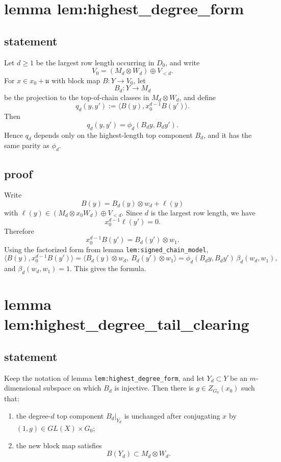 \documentclass[
]{article}
\providecommand{\tightlist}{%
  \setlength{\itemsep}{0pt}\setlength{\parskip}{0pt}}
\begin{document}
\section{lemma
lem:highest\_degree\_form}\label{lemma-lemhighest_degree_form}

\subsection{statement}\label{statement-11}

Let \(d\ge 1\) be the largest row length occurring in \(D_0\), and write
\[
V_0=(M_d\otimes W_d)\oplus V_{<d}.
\] For \(x\in x_0+\mathfrak u\) with block map \(B:Y\to V_0\), let \[
B_d:Y\to M_d
\] be the projection to the top-of-chain classes in \(M_d\otimes W_d\),
and define \[
q_d(y,y'):=\langle B(y),x_0^{d-1}B(y')\rangle.
\] Then \[
q_d(y,y')=\phi_d(B_dy,B_dy').
\] Hence \(q_d\) depends only on the highest-length top component
\(B_d\), and it has the same parity as \(\phi_d\).

\subsection{proof}\label{proof-11}

Write \[
B(y)=B_d(y)\otimes w_d+\ell(y)
\] with \(\ell(y)\in (M_d\otimes x_0W_d)\oplus V_{<d}\). Since \(d\) is
the largest row length, we have \[
x_0^{d-1}\ell(y')=0.
\] Therefore \[
x_0^{d-1}B(y')=B_d(y')\otimes w_1.
\] Using the factorized form from lemma
\texttt{lem:signed\_chain\_model}, \[
\langle B(y),x_0^{d-1}B(y')\rangle
=
\langle B_d(y)\otimes w_d,\ B_d(y')\otimes w_1\rangle
=
\phi_d(B_dy,B_dy')\,\beta_d(w_d,w_1),
\] and \(\beta_d(w_d,w_1)=1\). This gives the formula.

\section{lemma
lem:highest\_degree\_tail\_clearing}\label{lemma-lemhighest_degree_tail_clearing}

\subsection{statement}\label{statement-12}

Keep the notation of lemma \texttt{lem:highest\_degree\_form}, and let
\(Y_d\subset Y\) be an \(m\)-dimensional subspace on which \(B_d\) is
injective. Then there is \(g\in Z_{G_0}(x_0)\) such that:

\begin{enumerate}
\def\labelenumi{\arabic{enumi}.}
\tightlist
\item
  the degree-\(d\) top component \(B_d|_{Y_d}\) is unchanged after
  conjugating \(x\) by \((1,g)\in GL(X)\times G_0\);
\item
  the new block map satisfies \[
  B(Y_d)\subset M_d\otimes W_d .
  \]
\end{enumerate}
\end{document}
